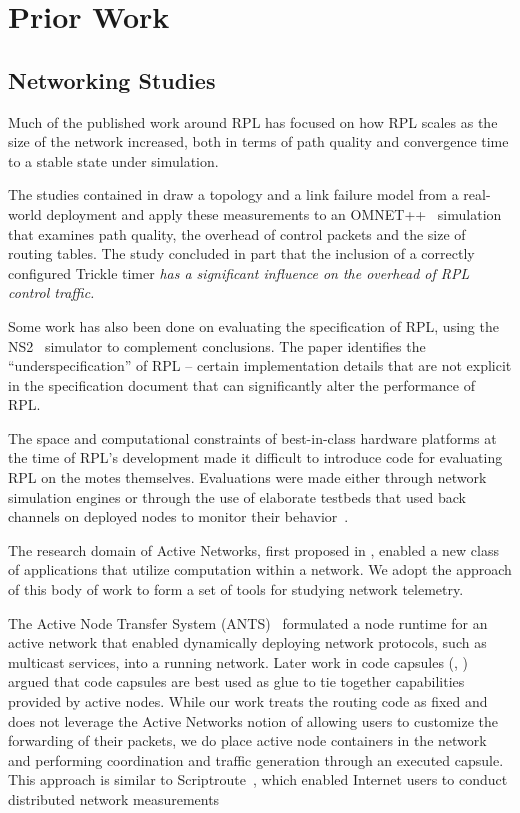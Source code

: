 \section{Prior Work}

\subsection{Networking Studies}
Much of the published work around RPL has focused on how RPL scales as the size
of the network increased, both in terms of path quality and convergence time to
a stable state under simulation. 

The studies contained in \cite{tripathi2010performance} draw a topology and a
link failure model from a real-world deployment and apply these measurements to
an OMNET++~\cite{omnet++} simulation that examines path quality, the overhead
of control packets and the size of routing tables. The study concluded in part
that the inclusion of a correctly configured Trickle timer \emph{has a significant influence
on the overhead of RPL control traffic.}

Some work \cite{clausen2011critical} has also been done on evaluating the
specification of RPL, using the NS2~\cite{ns2} simulator to complement
conclusions. The paper identifies the ``underspecification'' of RPL -- certain
implementation details that are not explicit in the specification document that
can significantly alter the performance of RPL.

The space and computational constraints of best-in-class hardware platforms at
the time of RPL's development made it difficult to introduce code for
evaluating RPL on the motes themselves. Evaluations were made either through
network simulation engines or through the use of elaborate testbeds that used
back channels on deployed nodes to monitor their
behavior~\cite{fonseca2008tracking}. 

The research domain of Active Networks, first proposed in
\cite{tennenhouse2002towards}, enabled a new class of applications that utilize
computation within a network. We adopt the approach of this body of work to
form a set of tools for studying network telemetry.

The Active Node Transfer System (ANTS)~\cite{wetherall1998ants} formulated a
node runtime for an active network that enabled dynamically deploying network
protocols, such as multicast services, into a running network. Later work in
code capsules (\cite{tennenhouse1997survey}, \cite{wetherall2002active}) argued
that code capsules are best used as glue to tie together capabilities provided
by active nodes. While our work treats the routing code as fixed and does not
leverage the Active Networks notion of allowing users to customize the
forwarding of their packets, we do place active node containers in the network
and performing coordination and traffic generation through an executed capsule.
This approach is similar to Scriptroute~\cite{spring2003scriptroute}, which
enabled Internet users to conduct distributed network measurements